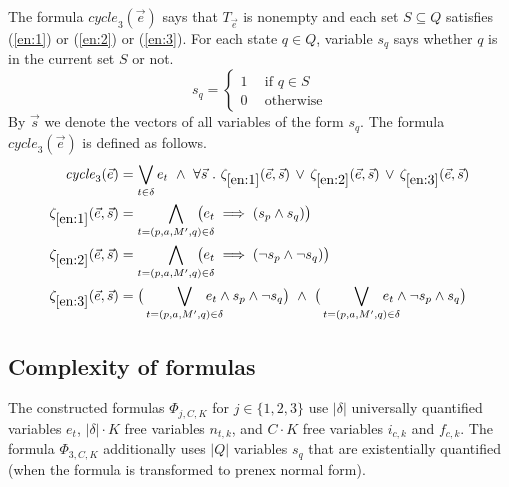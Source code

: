 \documentclass[a4paper,UKenglish,cleveref,autoref,thm-restate]{lipics-v2021}
\newcommand{\mcycle}{\mathit{cycle}}
\newcommand{\Te}{T_{\vec{e}}}
\begin{document}
The formula $\mcycle_3(\vec{e})$ says that $\Te$ is nonempty and each
set $S\subseteq Q$ satisfies (\ref{en:1}) or (\ref{en:2}) or
(\ref{en:3}).  For each state $q\in Q$, variable $s_q$ says whether
$q$ is in the current set $S$ or not.
\[s_q=\left\{
    \begin{array}{ll}
      1~~ & \textrm{if }q\in S\\[.5ex]
      0 & \textrm{otherwise}    
    \end{array}\right.
\]
By $\vec{s}$ we denote the vectors of all variables of the form $s_q$.
The formula $\mcycle_3(\vec{e})$ is defined as follows.
\begin{align*}
  \mcycle_3(\vec{e})
  &=\bigvee_{t\in\delta}e_t~\wedge~\forall\vec{s}~.~\zeta_{\ref{en:1}}(\vec{e},\vec{s})\,\vee\,
    \zeta_{\ref{en:2}}(\vec{e},\vec{s})\,\vee\,
    \zeta_{\ref{en:3}}(\vec{e},\vec{s})\\ %
  \zeta_{\ref{en:1}}(\vec{e},\vec{s}) &= \bigwedge_{t=(p,a,M',q)\in\delta}\hspace{-5mm}\big(e_t\implies (s_p\wedge s_q)\big)\\
  \zeta_{\ref{en:2}}(\vec{e},\vec{s}) &= \bigwedge_{t=(p,a,M',q)\in\delta}\hspace{-5mm}\big(e_t\implies (\neg s_p\wedge \neg s_q)\big)\\
  \zeta_{\ref{en:3}}(\vec{e},\vec{s}) &= \big(\bigvee_{t=(p,a,M',q)\in\delta}\hspace{-5mm}e_t\wedge s_p\wedge \neg s_q\big) ~\wedge~
  \big(\bigvee_{t=(p,a,M',q)\in\delta}\hspace{-5mm}e_t\wedge \neg s_p\wedge s_q\big)
\end{align*}

\subsection{Complexity of formulas}
The constructed formulas $\Phi_{j,C,K}$ for $j\in\{1,2,3\}$ use
$|\delta|$ universally quantified variables $e_t$, $|\delta|\cdot K$
free variables $n_{t,k}$, and $C\cdot K$ free variables $i_{c,k}$ and
$f_{c,k}$. The formula $\Phi_{3,C,K}$ additionally uses $|Q|$
variables $s_q$ that are existentially quantified (when the formula is
transformed to prenex normal form).
\end{document}
